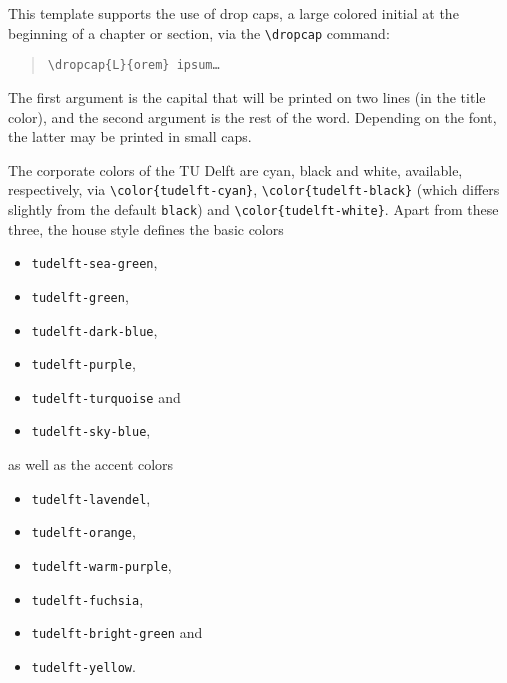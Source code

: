 This template supports the use of drop caps, a large colored initial at the beginning of a chapter or section, via the \texttt{\textbackslash dropcap} command:

\begin{quote}
	\texttt{\textbackslash dropcap\{L\}\{orem\} ipsum\ldots}
\end{quote}
The first argument is the capital that will be printed on two lines (in the title color), and the second argument is the rest of the word. Depending on the font, the latter may be printed in small caps.

The corporate colors of the TU Delft are cyan, black and white, available, respectively, via \texttt{\textbackslash color\{{\color{tudelft-cyan}tudelft-cyan}\}}, \texttt{\textbackslash color\{{\color{tudelft-black}tudelft-black}\}} (which differs slightly from the default \texttt{black}) and \texttt{\textbackslash color\{tudelft-white\}}. Apart from these three, the house style defines the basic colors
\begin{itemize}
	\itemsep 0pt
	\parskip 0pt
	\item\texttt{\color{tudelft-sea-green}tudelft-sea-green},
	\item\texttt{\color{tudelft-green}tudelft-green},
	\item\texttt{\color{tudelft-dark-blue}tudelft-dark-blue},
	\item\texttt{\color{tudelft-purple}tudelft-purple},
	\item\texttt{\color{tudelft-turquoise}tudelft-turquoise} and
	\item\texttt{\color{tudelft-sky-blue}tudelft-sky-blue},
\end{itemize}
as well as the accent colors
\begin{itemize}
	\itemsep 0pt
	\parskip 0pt
	\item\texttt{\color{tudelft-lavendel}tudelft-lavendel},
	\item\texttt{\color{tudelft-orange}tudelft-orange},
	\item\texttt{\color{tudelft-warm-purple}tudelft-warm-purple},
	\item\texttt{\color{tudelft-fuchsia}tudelft-fuchsia},
	\item\texttt{\color{tudelft-bright-green}tudelft-bright-green} and
	\item\texttt{\color{tudelft-yellow}tudelft-yellow}.
\end{itemize}



